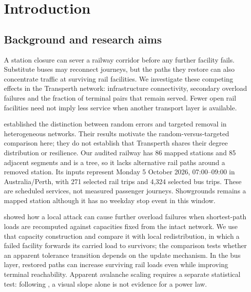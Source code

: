 
\section{Introduction}
\label{sec:introduction}

\subsection{Background and research aims}
A station closure can sever a railway corridor before any further facility
fails. Substitute buses may reconnect journeys, but the paths they restore can
also concentrate traffic at surviving rail facilities. We investigate these
competing effects in the Transperth network: infrastructure connectivity,
secondary overload failures and the fraction of terminal pairs that remain
served. Fewer open rail facilities need not imply less service when another
transport layer is available.

\citet{albert2000error} established the distinction between random errors and
targeted removal in heterogeneous networks. Their results motivate the
random-versus-targeted comparison here; they do not establish that Transperth
shares their degree distribution or resilience. Our audited railway
has 86 mapped stations and 85 adjacent segments and is a tree, so it lacks
alternative rail paths around a removed station. Its inputs represent
Monday 5 October 2026, 07:00--09:00 in Australia/Perth, with 271 selected rail
trips and 4,324 selected bus trips. These are scheduled services, not measured
passenger journeys. Showgrounds remains a mapped station although it has no
weekday stop event in this window.

\citet{motter2002cascade} showed how a local attack can cause further overload
failures when shortest-path loads are recomputed against capacities fixed from
the intact network. We use that capacity construction and compare it with local
redistribution, in which a failed facility forwards its carried load to
survivors; the comparison tests whether an apparent tolerance transition
depends on the update mechanism. In the bus layer, restored paths
can increase surviving rail loads even while improving terminal reachability.
Apparent avalanche scaling requires a separate statistical test: following
\citet{clauset2009power}, a visual slope alone is not evidence for a power law.

